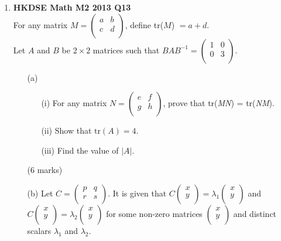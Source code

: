 \documentclass{report}
\begin{document}
\begin{enumerate}
	\newpage

	\item \textbf{HKDSE Math M2 2013 Q13}\\
	For any matrix $M = \begin{pmatrix}
		a&b\\c&d\\
	\end{pmatrix}$, define tr($M$) $= a + d$.\\
	Let $A$ and $B$ be $2 \times 2$ matrices such that $BAB^{-1} = \begin{pmatrix}
		1&0\\0&3\\
	\end{pmatrix}$. 
	\begin{enumerate}
		\item [(a)]
		\begin{enumerate}
			\item [(i)]For any matrix $N = \begin{pmatrix}
				e&f\\g&h\\
			\end{pmatrix}$, prove that tr(\textit{MN}) = tr(\textit{NM}).
			\item [(ii)]Show that $\text{tr}(A) = 4$. 
			\item [(iii)]Find the value of $|A|$.
		\end{enumerate}
		(6 marks)
		\item [(b)]Let $C = \begin{pmatrix}
			p&q\\r&s\\
		\end{pmatrix}$. It is given that $C \begin{pmatrix} x\\y\\ \end{pmatrix} = \lambda_1\begin{pmatrix} x\\y\\ \end{pmatrix}$ and $C \begin{pmatrix} x\\y\\ \end{pmatrix} = \lambda_2\begin{pmatrix} x\\y\\ \end{pmatrix}$ for some non-zero matrices $\begin{pmatrix} x\\y\\ \end{pmatrix}$ and distinct scalars $\lambda_1$ and $\lambda_2$. 

\end{enumerate}
\end{enumerate}
\end{document}
